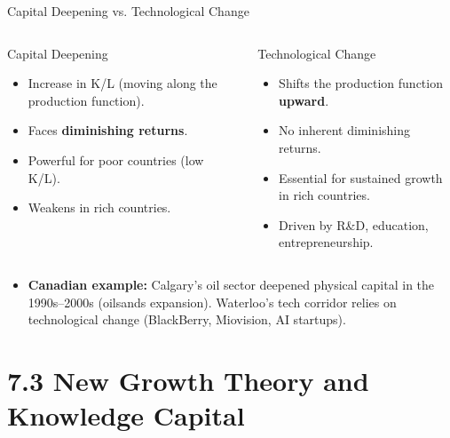 \documentclass[aspectratio=169]{beamer}
\begin{document}
\begin{frame}{Capital Deepening vs. Technological Change}
\transfade
\begin{columns}
\begin{block}{\textcolor{accent}{Capital Deepening}}
\begin{itemize}
  \item Increase in K/L (moving along the production function).
  \item Faces \textbf{diminishing returns}.
  \item Powerful for poor countries (low K/L).
  \item Weakens in rich countries.
\end{itemize}
\end{block}
\begin{block}{\textcolor{leafgreen}{Technological Change}}
\begin{itemize}
  \item Shifts the production function \textbf{upward}.
  \item No inherent diminishing returns.
  \item Essential for sustained growth in rich countries.
  \item Driven by R\&D, education, entrepreneurship.
\end{itemize}
\end{block}
\end{columns}
\vspace{0.5em}
\begin{itemize}[<+->]
  \item \textbf{Canadian example:} Calgary's oil sector deepened physical capital in the 1990s--2000s (oilsands expansion). Waterloo's tech corridor relies on technological change (BlackBerry, Miovision, AI startups).
\end{itemize}
\end{frame}

\section{7.3 New Growth Theory and Knowledge Capital}
\end{document}

